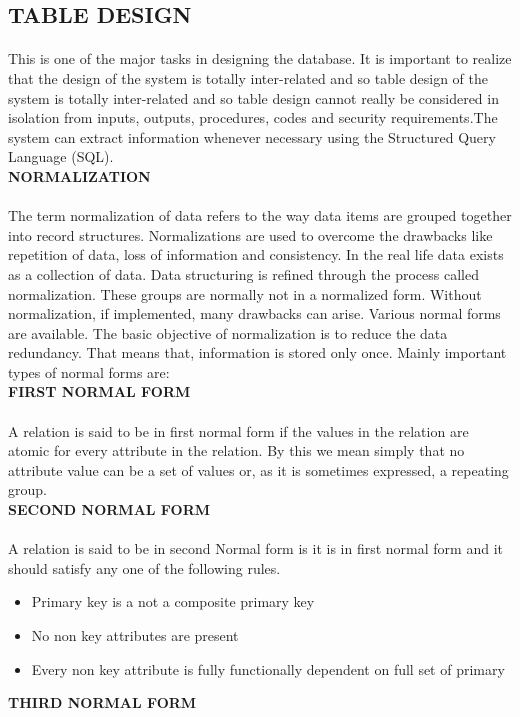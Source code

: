 \documentclass[a4paper, 12pt]{report}
\begin{document}
\subsection{TABLE DESIGN}
\paragraph{}This is one of the major tasks in designing the database. It is important to realize that
the design of the system is totally inter-related and so table design of the system is totally
inter-related and so table design cannot really be considered in isolation from inputs, outputs,
procedures, codes and security requirements.The system can
extract information whenever necessary using the Structured Query Language (SQL).
\\
\textbf{NORMALIZATION}
\paragraph{}The term normalization of data refers to the way data items are grouped together into
record structures. Normalizations are used to overcome the drawbacks like repetition of
data, loss of information and consistency. In the real life data exists as a collection of data.
Data structuring is refined through the process called normalization. These groups are
normally not in a normalized form. Without normalization, if implemented, many
drawbacks can arise. Various normal forms are available. The basic objective of
normalization is to reduce the data redundancy. That means that, information is stored only
once. Mainly important types of normal forms are:\\
\textbf{FIRST NORMAL FORM}
\paragraph{} A relation is said to be in first normal form if the values in the relation are atomic for
every attribute in the relation. By this we mean simply that no attribute value can be a set of
values or, as it is sometimes expressed, a repeating group.\\
\textbf{SECOND NORMAL FORM}
\paragraph{}A relation is said to be in second Normal form is it is in first normal form and it
should satisfy any one of the following rules.
\begin{itemize}
\item Primary key is a not a composite primary key
\item No non key attributes are present
\item Every non key attribute is fully functionally dependent on full set of primary
\end{itemize}
\textbf{THIRD NORMAL FORM}\\
\end{document}
